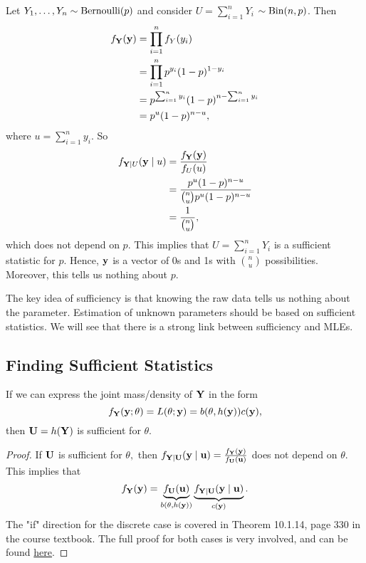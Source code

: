 \begin{eg}
Let $Y_1,\ldots, Y_n\sim \operatorname*{Bernoulli}(p)$ and consider $U=\sum^n_{i=1}Y_i$ $\sim \operatorname*{Bin}(n,p)$. Then
\begin{align*}
    f_\mathbf Y(\mathbf y)&=\prod^n_{i=1}f_Y(y_i)\\
    &=\prod^n_{i=1}p^{y_i}(1-p)^{1-y_i} \\
    &=p^{\sum^n_{i=1}y_i}(1-p)^{n-\sum^n_{i=1}y_i}\\
    &=p^u(1-p)^{n-u},
\end{align*}
where $u=\sum^n_{i=1}y_i.$ So
\begin{align*}
f_{\mathbf Y\mid U}{(\mathbf y\mid u)}&=\frac{f_\mathbf Y(\mathbf y)}{f_U(u)} \\
    &=\frac{p^u(1-p)^{n-u}}{\binom{n}{u}p^u(1-p)^{n-u}} \\
    &=\frac{1}{\binom{n}{u}},
\end{align*}
which does not depend on $p.$ This implies that $U=\sum^n_{i=1}Y_i$ is a sufficient statistic for $p.$ Hence, $\mathbf y$ is a vector of 0s and 1s with $\binom{n}{u}$ possibilities. Moreover, this tells us nothing about $p.$
\end{eg}
\begin{remark}
The key idea of sufficiency is that knowing the raw data tells us nothing about the parameter. Estimation of unknown parameters should be based on sufficient statistics. We will see that there is a strong link between sufficiency and MLEs.
\end{remark}

\subsection{Finding Sufficient Statistics}
\begin{theorem}
If we can express the joint \phantom{xxx} \linebreak mass/density of $\mathbf Y$ in the form
$$
f_\mathbf Y(\mathbf y;\theta)=L(\theta;\mathbf y)=b(\theta,h(\mathbf y))c(\mathbf y),
$$
then $\mathbf U=h(\mathbf Y)$ is sufficient for $\theta.$ 
\end{theorem}
\begin{proof}
If $\mathbf U$ is sufficient for $\theta,$ then $f_{\mathbf Y\mid \mathbf U}(\mathbf y\mid \mathbf u)=\frac{f_\mathbf Y(\mathbf y)}{f_\mathbf U(\mathbf u)}$ does not depend on $\theta.$ This implies that
$$
f_\mathbf Y(\mathbf y)=\underbrace{f_\mathbf U(\mathbf u)}_{b(\theta,h(\mathbf y))}\underbrace{f_{\mathbf Y\mid\mathbf U}(\mathbf y\mid \mathbf u)}_{c(\mathbf y)}.
$$
The "if" direction for the discrete case is covered in Theorem 10.1.14, page 330 in the course textbook. The full proof for both cases is very involved, and can be found \href{https://en.wikipedia.org/wiki/Sufficient_statistic#Fisher%E2%80%93Neyman_factorization_theorem}{here}.
\end{proof}

